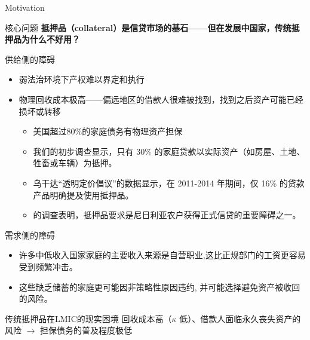 \begin{frame}[allowframebreaks]{Motivation}
  \begin{block}{核心问题}
    \textbf{抵押品（collateral）是信贷市场的基石——但在发展中国家，传统抵押品为什么不好用？}
  \end{block}

 \medskip

  \begin{block}{供给侧的障碍}
  \begin{itemize}
    \item 弱法治环境下产权难以界定和执行
    \item 物理回收成本极高——偏远地区的借款人很难被找到，找到之后资产可能已经损坏或转移
    
    \begin{itemize}
      \item 美国超过80\%的家庭债务有物理资产担保
      \item 我们的初步调查显示，只有 30\% 的家庭贷款以实际资产（如房屋、土地、牲畜或车辆）为抵押。 
      \item 乌干达“透明定价倡议”的数据显示，在 2011-2014 年期间，仅 16\% 的贷款产品明确提及使用抵押品。 
      \item \textcite{elum2018analysis} 的调查表明，抵押品要求是尼日利亚农户获得正式信贷的重要障碍之一。
    \end{itemize}
  \end{itemize}
  \end{block}

 \medskip

  \begin{block}{需求侧的障碍}
  \begin{itemize}
    \item 许多中低收入国家家庭的主要收入来源是自营职业,这比正规部门的工资更容易受到频繁冲击。
    \item 这些缺乏储蓄的家庭更可能因非策略性原因违约,  并可能选择避免资产被收回的风险。
  \end{itemize}
\end{block}
  \medskip

  \begin{block}{传统抵押品在LMIC的现实困境}
  回收成本高（$\kappa$ 低）、借款人面临永久丧失资产的风险 $\to$ 担保债务的普及程度极低
  \end{block}
\end{frame}

